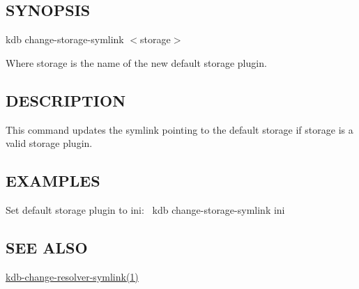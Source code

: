 \subsection*{S\+Y\+N\+O\+P\+S\+IS}

{\ttfamily kdb change-\/storage-\/symlink $<$storage$>$}

Where {\ttfamily storage} is the name of the new default storage plugin.

\subsection*{D\+E\+S\+C\+R\+I\+P\+T\+I\+ON}

This command updates the symlink pointing to the default storage if {\ttfamily storage} is a valid storage plugin.

\subsection*{E\+X\+A\+M\+P\+L\+ES}

Set default storage plugin to ini\+:~\newline
 {\ttfamily kdb change-\/storage-\/symlink ini}

\subsection*{S\+EE A\+L\+SO}


\begin{DoxyItemize}
\item \hyperlink{doc_help_kdb-change-resolver-symlink_md}{kdb-\/change-\/resolver-\/symlink(1)} 
\end{DoxyItemize}